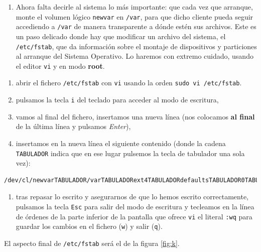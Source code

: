 \documentclass[
]{memoir}
\providecommand{\tightlist}{%
  \setlength{\itemsep}{0pt}\setlength{\parskip}{0pt}}
\begin{document}
\begin{enumerate}
\def\labelenumi{\arabic{enumi}.}
\setcounter{enumi}{11}
\tightlist
\item
  Ahora falta decirle al sistema lo más importante: que cada vez que arranque, monte el volumen lógico \texttt{newvar} en \texttt{/var}, para que dicho cliente pueda seguir accediendo a \texttt{/var} de manera transparente a dónde estén sus archivos. Este es un paso delicado donde hay que modificar un archivo del sistema, el \texttt{/etc/fstab}, que da información sobre el montaje de dispositivos y particiones al arranque del Sistema Operativo. Lo haremos con extremo cuidado, usando el editor \texttt{vi} y en modo \textbf{root}.
\end{enumerate}

\begin{enumerate}
\def\labelenumi{\roman{enumi}.}
\tightlist
\item
  abrir el fichero \texttt{/etc/fstab} con \texttt{vi} usando la orden \texttt{sudo\ vi\ /etc/fstab}.
\item
  pulsamos la tecla \texttt{i} del teclado para acceder al modo de escritura,
\item
  vamos al final del fichero, insertamos una nueva línea (nos colocamos \textbf{al final} de la última línea y pulsamos \emph{Enter}),
\item
  insertamos en la nueva línea el siguiente contenido (donde la cadena \texttt{TABULADOR} indica que en ese lugar pulsemos la tecla de tabulador una sola vez):
\end{enumerate}

\begin{verbatim}
/dev/cl/newvarTABULADOR/varTABULADORext4TABULADORdefaultsTABULADOR0TABULADOR0
\end{verbatim}

\begin{enumerate}
\def\labelenumi{\alph{enumi}.}
\setcounter{enumi}{21}
\tightlist
\item
  tras repasar lo escrito y asegurarnos de que lo hemos escrito correctamente, pulsamos la tecla \texttt{Esc} para salir del modo de escritura y tecleamos en la línea de órdenes de la parte inferior de la pantalla que ofrece \texttt{vi} el literal \texttt{:wq} para guardar los cambios en el fichero (\texttt{w}) y salir (\texttt{q}).
\end{enumerate}

El aspecto final de \texttt{/etc/fstab} será el de la figura \ref{fig:k}.
\end{document}
